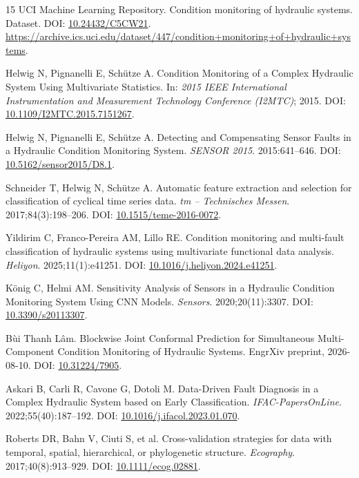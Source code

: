 \documentclass[11pt,a4paper]{article}
\begin{document}
\begin{thebibliography}{15}
 UCI Machine Learning Repository. Condition monitoring of hydraulic systems. Dataset. DOI: \href{https://doi.org/10.24432/C5CW21}{10.24432/C5CW21}. \url{https://archive.ics.uci.edu/dataset/447/condition+monitoring+of+hydraulic+systems}.

 Helwig N, Pignanelli E, Sch{\"u}tze A. Condition Monitoring of a Complex Hydraulic System Using Multivariate Statistics. In: \emph{2015 IEEE International Instrumentation and Measurement Technology Conference (I2MTC)}; 2015. DOI: \href{https://doi.org/10.1109/I2MTC.2015.7151267}{10.1109/I2MTC.2015.7151267}.

 Helwig N, Pignanelli E, Sch{\"u}tze A. Detecting and Compensating Sensor Faults in a Hydraulic Condition Monitoring System. \emph{SENSOR 2015}. 2015:641--646. DOI: \href{https://doi.org/10.5162/sensor2015/D8.1}{10.5162/sensor2015/D8.1}.

 Schneider T, Helwig N, Sch{\"u}tze A. Automatic feature extraction and selection for classification of cyclical time series data. \emph{tm -- Technisches Messen}. 2017;84(3):198--206. DOI: \href{https://doi.org/10.1515/teme-2016-0072}{10.1515/teme-2016-0072}.

 Yildirim C, Franco-Pereira AM, Lillo RE. Condition monitoring and multi-fault classification of hydraulic systems using multivariate functional data analysis. \emph{Heliyon}. 2025;11(1):e41251. DOI: \href{https://doi.org/10.1016/j.heliyon.2024.e41251}{10.1016/j.heliyon.2024.e41251}.

 K{\"o}nig C, Helmi AM. Sensitivity Analysis of Sensors in a Hydraulic Condition Monitoring System Using CNN Models. \emph{Sensors}. 2020;20(11):3307. DOI: \href{https://doi.org/10.3390/s20113307}{10.3390/s20113307}.

 B{\`u}i Thanh L{\^a}m. Blockwise Joint Conformal Prediction for Simultaneous Multi-Component Condition Monitoring of Hydraulic Systems. EngrXiv preprint, 2026-08-10. DOI: \href{https://doi.org/10.31224/7905}{10.31224/7905}.

 Askari B, Carli R, Cavone G, Dotoli M. Data-Driven Fault Diagnosis in a Complex Hydraulic System based on Early Classification. \emph{IFAC-PapersOnLine}. 2022;55(40):187--192. DOI: \href{https://doi.org/10.1016/j.ifacol.2023.01.070}{10.1016/j.ifacol.2023.01.070}.

 Roberts DR, Bahn V, Ciuti S, et al. Cross-validation strategies for data with temporal, spatial, hierarchical, or phylogenetic structure. \emph{Ecography}. 2017;40(8):913--929. DOI: \href{https://doi.org/10.1111/ecog.02881}{10.1111/ecog.02881}.


\end{thebibliography}
\end{document}

